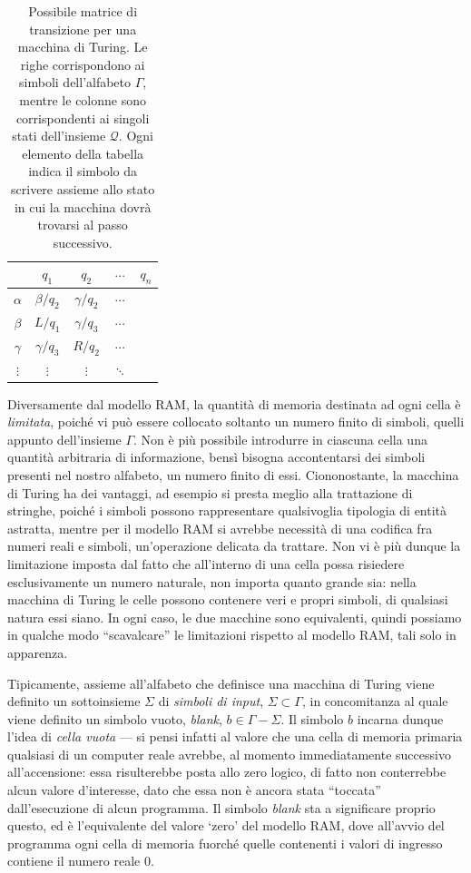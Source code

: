 \documentclass[10pt]{\classname}
\theoremstyle{definition}
\theoremstyle{definition}
\begin{document}
\begin{table}[ht]
\centering
\begin{tabular}{c|cccc}
    & $q_1$ & $q_2$ & $\cdots$ & $q_n$ \\
    \hline
$\alpha$ & $\beta/q_2$ & $\gamma/q_2$ & $\cdots$ & \\
$\beta$ & $L/q_1$ & $\gamma/q_3$ & $\cdots$ & \\
$\gamma$ & $\gamma/q_3$ & $R/q_2$ & $\cdots$ & \\
$\vdots$ & $\vdots$ & $\vdots$ & $\ddots$ &    
\end{tabular}
\caption{Possibile matrice di transizione per una macchina di Turing. Le righe
corrispondono ai simboli dell'alfabeto $\Gamma$, mentre le colonne sono
corrispondenti ai singoli stati dell'insieme $\mathcal
Q$. Ogni elemento della tabella indica il simbolo da scrivere assieme allo stato in cui la
macchina dovrà trovarsi al passo successivo.}\label{tab:matriceTransizione}
\end{table}
\bigskip


Diversamente dal modello RAM, la quantità di memoria destinata ad ogni cella è
\emph{limitata}, poiché vi può essere collocato soltanto un numero finito di
simboli, quelli appunto dell'insieme $\Gamma$. Non è più possibile introdurre in ciascuna cella una quantità arbitraria di informazione, bensì bisogna accontentarsi dei simboli presenti
nel nostro alfabeto, un numero finito di essi. Ciononostante, la macchina di
Turing ha dei vantaggi, ad esempio si presta meglio alla trattazione di
stringhe, poiché i simboli possono rappresentare qualsivoglia tipologia di
entità astratta, mentre per il modello RAM si avrebbe necessità di una codifica
fra numeri reali e simboli, un'operazione delicata da trattare. Non vi è più dunque la limitazione
imposta dal fatto che all'interno di una cella possa risiedere esclusivamente
un numero naturale, non importa quanto grande sia: nella macchina di Turing le
celle possono contenere veri e propri simboli, di qualsiasi natura essi siano.
In ogni caso, le due macchine sono equivalenti, quindi possiamo in qualche modo
``scavalcare'' le limitazioni rispetto al modello RAM, tali solo in apparenza.

Tipicamente, assieme all'alfabeto che definisce una macchina di Turing viene definito
un sottoinsieme $\Sigma$ di \emph{simboli di input}, $\Sigma \subset \Gamma$, in
concomitanza al quale viene definito un simbolo vuoto, \emph{blank}, $b \in
\Gamma - \Sigma$. Il simbolo $b$ incarna dunque l'idea di \emph{cella
vuota} --- si pensi infatti al valore che una cella di memoria primaria
qualsiasi di un computer reale avrebbe, al momento immediatamente successivo
all'accensione: essa risulterebbe posta allo zero logico, di fatto non
conterrebbe alcun valore d'interesse, dato che essa non è ancora stata
``toccata'' dall'esecuzione di alcun programma. Il simbolo \emph{blank} sta a
significare proprio questo, ed è l'equivalente del valore `zero' del modello
RAM, dove all'avvio del programma ogni cella di memoria fuorché quelle
contenenti i valori di ingresso contiene il numero reale $0$.
\end{document}
